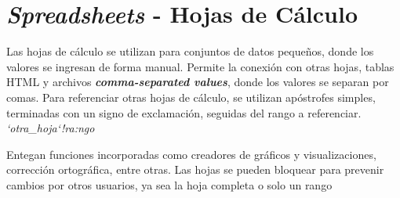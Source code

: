 
\section{\textit{Spreadsheets} - Hojas de Cálculo}
Las hojas de cálculo se utilizan para conjuntos de datos pequeños, donde los valores se ingresan de forma manual. Permite la conexión con otras hojas, tablas HTML y archivos \textit{\textbf{comma-separated values}}, donde los valores se separan por comas. Para referenciar otras hojas de cálculo, se utilizan apóstrofes simples, terminadas con un signo de exclamación, seguidas del rango a referenciar. \textit{`otra\_hoja`!ra:ngo}

Entegan funciones incorporadas como creadores de gráficos y visualizaciones, corrección ortográfica, entre otras. Las hojas se pueden bloquear para prevenir cambios por otros usuarios, ya sea la hoja completa o solo un rango

